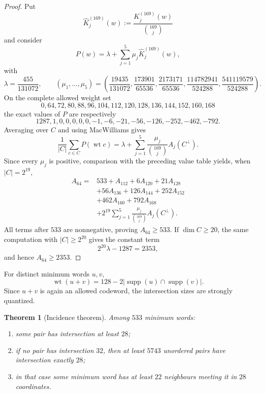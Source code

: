\documentclass[11pt,reqno]{amsart}
\newtheorem{theorem}{Theorem}[section]
\theoremstyle{remark}
\newcommand{\supp}{\operatorname{supp}}
\newcommand{\wt}{\operatorname{wt}}
\begin{document}
\begin{proof}
Put
\[
\widehat K_j^{(169)}(w):=\frac{K_j^{(169)}(w)}{\binom{169}{j}}
\]
and consider
\[
P(w)=\lambda+\sum_{j=1}^5\mu_j\widehat K_j^{(169)}(w),
\]
with
\[
\lambda=\frac{455}{131072},\qquad
(\mu_1,\ldots,\mu_5)=
\left(
\frac{19435}{131072},
\frac{173901}{65536},
\frac{2173171}{65536},
\frac{114782941}{524288},
\frac{541119579}{524288}
\right).
\]
On the complete allowed weight set
\[
0,64,72,80,88,96,104,112,120,128,136,144,152,160,168
\]
the exact values of $P$ are respectively
\[
1287,1,0,0,0,0,0,-1,-6,-21,-56,-126,-252,-462,-792.
\]
Averaging over $C$ and using MacWilliams gives
\[
\frac1{|C|}\sum_{c\in C}P(\wt c)
=\lambda+\sum_{j=1}^5
 \frac{\mu_j}{\binom{169}{j}}A_j(C^\perp).
\]
Since every $\mu_j$ is positive, comparison with the preceding value table yields, when $|C|=2^{19}$,
\[
\begin{aligned}
A_{64}={}&533+A_{112}+6A_{120}+21A_{128}\\
&+56A_{136}+126A_{144}+252A_{152}\\
&+462A_{160}+792A_{168}\\
&+2^{19}\sum_{j=1}^5
\frac{\mu_j}{\binom{169}{j}}A_j(C^\perp).
\end{aligned}
\]
All terms after $533$ are nonnegative, proving $A_{64}\ge533$.  If $\dim C\ge20$, the same computation with $|C|\ge2^{20}$ gives the constant term
\[
2^{20}\lambda-1287=2353,
\]
and hence $A_{64}\ge2353$.
\end{proof}

For distinct minimum words $u,v$,
\[
\wt(u+v)=128-2|\supp(u)\cap\supp(v)|.
\]
Since $u+v$ is again an allowed codeword, the intersection sizes are strongly quantized.

\begin{theorem}[Incidence theorem]\label{thm:incidence}
Among $533$ minimum words:
\begin{enumerate}[label=(\roman*)]
\item some pair has intersection at least $28$;
\item if no pair has intersection $32$, then at least $5743$ unordered pairs have intersection exactly $28$;
\item in that case some minimum word has at least $22$ neighbours meeting it in $28$ coordinates.
\end{enumerate}
\end{theorem}
\end{document}
